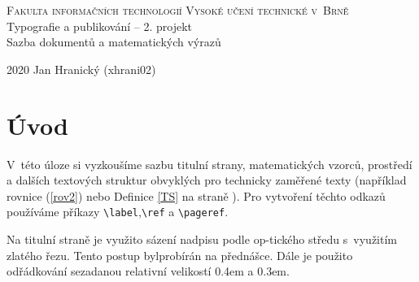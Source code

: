 \documentclass[11pt,a4paper,twocolumn]{article}
\begin{document}
\begin{titlepage}
\begin{center}

\Huge
\textsc{Fakulta informačních technologií Vysoké učení technické v~Brně\\}
\LARGE
Typografie a publikování -- 2. projekt \\
Sazba dokumentů a matematických výrazů
\end{center}
{\large 2020 \hfill Jan Hranický (xhrani02)}
\end{titlepage}
\section*{Úvod}
V~této úloze si vyzkoušíme sazbu titulní strany, matematických vzorců, prostředí a dalších textových struktur obvyklých pro technicky zaměřené texty (například rovnice (\ref{rov2}) nebo Definice \ref{TS} na straně \pageref{TS}). Pro vytvoření těchto odkazů používáme příkazy \verb|\label|,\verb|\ref| a \verb|\pageref|.

Na titulní straně je využito sázení nadpisu podle op-tického středu s~využitím zlatého řezu. Tento postup bylprobírán na přednášce. Dále je použito odřádkování sezadanou relativní velikostí 0.4em a 0.3em.
\end{document}
